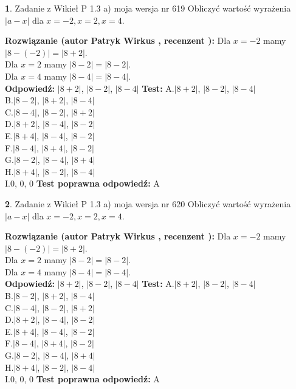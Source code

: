 \documentclass[12pt, a4paper]{article}
\theoremstyle{definition} %
\newtheorem{zad}{}
\newcommand{\zadStart}[1]{\begin{zad}#1\newline}
\newcommand{\zadStop}{\end{zad}}
\newcommand{\rozwStart}[2]{\noindent \textbf{Rozwiązanie (autor #1 , recenzent #2): }\newline}
\newcommand{\rozwStop}{\newline}
\newcommand{\odpStart}{\noindent \textbf{Odpowiedź:}\newline}
\newcommand{\odpStop}{\newline}
\newcommand{\testStart}{\noindent \textbf{Test:}\newline}
\newcommand{\testStop}{\newline}
\newcommand{\kluczStart}{\noindent \textbf{Test poprawna odpowiedź:}\newline}
\newcommand{\kluczStop}{\newline}
\begin{document}
\zadStart{Zadanie z Wikieł P 1.3 a) moja wersja nr 619}
Obliczyć wartość wyrażenia $|a - x|$ dla $x=-2,x=2,x=4$.
\zadStop
\rozwStart{Patryk Wirkus}{}
Dla $x = -2$ mamy $|8 - (-2)| = |8 + 2|$.\\
Dla $x = 2$ mamy $|8 - 2| = |8 - 2|$.\\
Dla $x = 4$ mamy $|8 - 4| = |8 - 4|$.\\
\rozwStop
\odpStart
$|8 + 2|$, $|8 - 2|$, $|8 - 4|$
\odpStop
\testStart
A.$|8 + 2|$, $|8 - 2|$, $|8 - 4|$\\
B.$|8 - 2|$, $|8 + 2|$, $|8 - 4|$\\
C.$|8 - 4|$, $|8 - 2|$, $|8 + 2|$\\
D.$|8 + 2|$, $|8 - 4|$, $|8 - 2|$\\
E.$|8 + 4|$, $|8 - 4|$, $|8 - 2|$\\
F.$|8 - 4|$, $|8 + 4|$, $|8 - 2|$\\
G.$|8 - 2|$, $|8 - 4|$, $|8 + 4|$\\
H.$|8 + 4|$, $|8 - 2|$, $|8 - 4|$\\
I.$0$, $0$, $0$
\testStop
\kluczStart
A
\kluczStop



\zadStart{Zadanie z Wikieł P 1.3 a) moja wersja nr 620}
Obliczyć wartość wyrażenia $|a - x|$ dla $x=-2,x=2,x=4$.
\zadStop
\rozwStart{Patryk Wirkus}{}
Dla $x = -2$ mamy $|8 - (-2)| = |8 + 2|$.\\
Dla $x = 2$ mamy $|8 - 2| = |8 - 2|$.\\
Dla $x = 4$ mamy $|8 - 4| = |8 - 4|$.\\
\rozwStop
\odpStart
$|8 + 2|$, $|8 - 2|$, $|8 - 4|$
\odpStop
\testStart
A.$|8 + 2|$, $|8 - 2|$, $|8 - 4|$\\
B.$|8 - 2|$, $|8 + 2|$, $|8 - 4|$\\
C.$|8 - 4|$, $|8 - 2|$, $|8 + 2|$\\
D.$|8 + 2|$, $|8 - 4|$, $|8 - 2|$\\
E.$|8 + 4|$, $|8 - 4|$, $|8 - 2|$\\
F.$|8 - 4|$, $|8 + 4|$, $|8 - 2|$\\
G.$|8 - 2|$, $|8 - 4|$, $|8 + 4|$\\
H.$|8 + 4|$, $|8 - 2|$, $|8 - 4|$\\
I.$0$, $0$, $0$
\testStop
\kluczStart
A
\kluczStop
\end{document}
